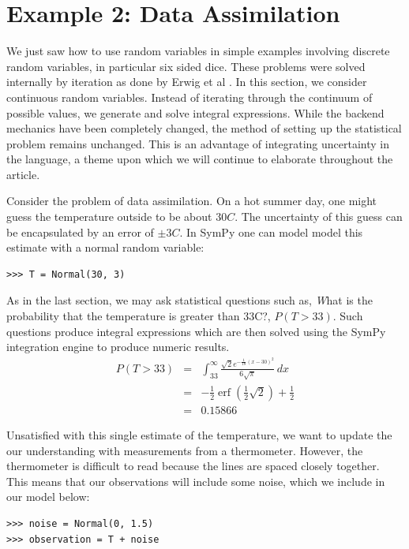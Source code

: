 \section{Example 2: Data Assimilation}

We just saw how to use random variables in simple examples involving
discrete random variables, in particular six sided dice. These problems were
solved internally by iteration as done by Erwig et al \cite{Erwig2006}. In this
section, we consider continuous random variables. Instead of iterating through
the continuum of possible values, we generate and solve integral expressions.
 While the backend mechanics have been completely changed, the
method of setting up the statistical problem remains unchanged. This is an
advantage of integrating uncertainty in the language, a theme upon which we
will continue to elaborate throughout the article.

Consider the problem of data assimilation. On a hot summer day, one might guess
the temperature outside to be about $30C$. The uncertainty of this guess can be
encapsulated by an error of $\pm3C$. In SymPy one can model model this estimate
with a normal random variable:

\begin{lstlisting}
>>> T = Normal(30, 3)
\end{lstlisting}

As in the last section, we may ask statistical questions such as, {\emph What is the
probability that the temperature is greater than 33C?}, $P(T>33)$. Such
questions produce integral expressions which are then solved using the SymPy
integration engine to produce numeric results.
\begin{eqnarray*}
P(T>33) & = & \int_{33}^{\infty} \frac{\sqrt{2} e^{- \frac{1}{18} \left(x -30\right)^{2}}}{6 \sqrt{\pi}}\, dx \\
& = & - \frac{1}{2} \operatorname{erf}{\left (\frac{1}{2} \sqrt{2} \right )} + \frac{1}{2} \\
& = & 0.15866
\end{eqnarray*}

Unsatisfied with this single estimate of the temperature, we want to update the
our understanding with measurements from a thermometer. However, the thermometer is difficult to read because the lines are spaced closely
together.  This means that our observations will include some noise, which we
include in our model below:

\begin{lstlisting}
>>> noise = Normal(0, 1.5)
>>> observation = T + noise
\end{lstlisting}

